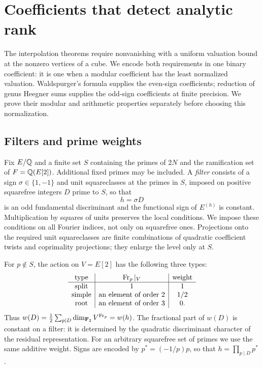 \section{Coefficients that detect analytic rank}
\label{cs:coefficient-systems}

The interpolation theorems require nonvanishing with a uniform valuation
bound at the nonzero vertices of a cube. We encode both requirements in
one binary coefficient: it is one when a modular coefficient has the
least normalized valuation. Waldspurger's formula supplies the even-sign
coefficients; reduction of genus Heegner sums supplies the odd-sign
coefficients at finite precision. We prove their modular and arithmetic
properties separately before choosing this normalization.

\subsection{Filters and prime weights}

Fix $E/\mathbb Q$ and a finite set $S$ containing the primes of $2N$ and the
ramification set of $F=\mathbb Q(E[2])$.  Additional fixed primes may be included.
A \emph{filter} consists of a sign $\sigma\in\{1,-1\}$ and unit
squareclasses at the primes in $S$, imposed on positive squarefree integers
$D$ prime to $S$, so that
\[
                     h=\sigma D
\]
is an odd fundamental discriminant and the functional sign of $E^{(h)}$
is constant.  Multiplication by squares of units preserves the local
conditions.  We impose these conditions on all Fourier indices, not only
on squarefree ones.  Projections onto the required unit squareclasses are
finite combinations of quadratic coefficient twists and coprimality
projections; they enlarge the level only at $S$.

For $p\notin S$, the action on $V=E[2]$ has the following three types:
\[
\begin{array}{c|c|c}
\text{type}&\operatorname{Fr}_p|_V&\text{weight}\\ \hline
\text{split}&1&1\\
\text{simple}&\text{an element of order }2&1/2\\
\text{root}&\text{an element of order }3&0.
\end{array}
\]
Thus $w(D)=\frac12\sum_{p\mid D}\dim_{\mathbf F_2}V^{\operatorname{Fr}_p}=w(h)$.
The fractional part of $w(D)$ is constant on a filter: it is determined
by the quadratic discriminant character of the residual representation.
For an arbitrary squarefree set of primes we use the same additive
weight.  Signs are encoded by $p^*=(-1/p)p$, so that $h=\prod_{p\mid D}p^*$.

